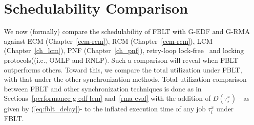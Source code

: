 \section{Schedulability Comparison}\label{schedulabiltiy comparison}
%
We now (formally) compare the schedulability of FBLT with G-EDF and G-RMA against ECM (Chapter~\ref{ecm-rcm}), RCM (Chapter~\ref{ecm-rcm}), LCM (Chapter~\ref{ch_lcm}), PNF (Chapter~\ref{ch_pnf}), retry-loop lock-free~\cite{key-5} and locking protocols((i.e., OMLP\cite{springerlink:10.1007/s10617-012-9090-1,key-3} and RNLP\cite{6257574}). Such a comparison will reveal when FBLT outperforms others. Toward this, we compare the total utilization under FBLT, with that under the other synchronization methods. Total utilization comparison between FBLT and other synchronization techniques is done as in Sections~\ref{performance g-edf-lcm} and~\ref{rma eval} with the addition of $D(\tau_i^x)$ - as given by (\ref{eq:fblt_delay})- to the inflated execution time of any job $\tau_i^x$ under FBLT.
%
